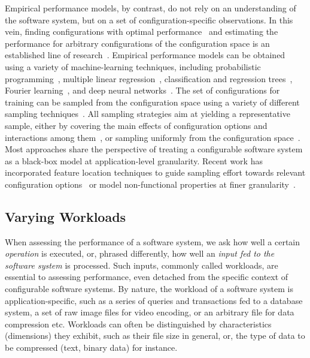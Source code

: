 Empirical performance models, by contrast, do not rely on an understanding of the software system, but on a set of configuration-specific observations. In this vein, finding configurations with optimal performance~\cite{nairUsingBadLearners2017,nairFlash18,ohFindingNearoptimalConfigurations2017} and estimating the performance for arbitrary configurations of the configuration space is an established line of research~\cite{siegmundPerformanceinfluenceModelsHighly2015,haDeepPerf2019,perfAL,guoVariabilityawarePerformancePrediction2013,sarkarCostEfficientSamplingPerformance,guo_2018_data,fourier_learning_2015,perLasso}.
Empirical performance models can be obtained using a variety of machine-learning techniques, including probabilistic programming~\cite{dorn2020}, multiple linear regression~\cite{siegmundPerformanceinfluenceModelsHighly2015}, classification and regression trees~\cite{guoVariabilityawarePerformancePrediction2013,sarkarCostEfficientSamplingPerformance,guo_2018_data}, Fourier learning~\cite{fourier_learning_2015,perLasso}, and deep neural networks~\cite{haDeepPerf2019,perfAL}.
The set of configurations for training can be sampled from the configuration space using a variety of different sampling techniques~\cite{kaltenecker_interplay_2020}. All sampling strategies aim at yielding a representative sample, either by covering the main effects of configuration options and interactions among them~\cite{siegmundPredictingPerformanceAutomated2012}, or sampling uniformly from the configuration space~\cite{ohFindingNearoptimalConfigurations2017,kaltenecker_distance-based_2019}.
Most approaches share the perspective of treating a configurable software system as a black-box model at application-level granularity. Recent work has incorporated feature location techniques to guide sampling effort towards relevant configuration options~\cite{velez_2020_configcrusher_jase,velez_comprex_2021} or model non-functional properties at finer granularity~\cite{weber_white_2021}.

\subsection{Varying Workloads}\label{sec:varying_workloads}
When assessing the performance of a software system, we ask how well a certain \textit{operation} is executed, or, phrased differently, how well an \textit{input fed to the software system} is processed. Such inputs, commonly called workloads, are essential to assessing performance, even detached from the specific context of configurable software systems. By nature, the workload of a software system is application-specific, such as a series of queries and transactions fed to a database system, a set of raw image files for video encoding, or an arbitrary file for data compression etc. Workloads can often be distinguished by characteristics (dimensions) they exhibit, such as their file size in general, or, the  type of data to be compressed (text, binary data) for instance.

